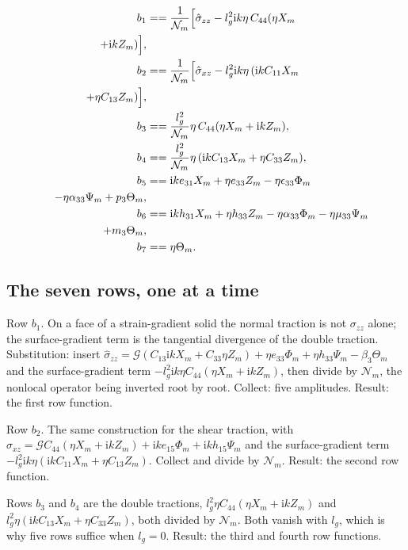 \documentclass[11pt]{article}
\makeatletter
\newif\ifshowworked
\newenvironment{worked}{%
  \ifshowworked\par\smallskip\noindent\textit{Working.}\par\smallskip\else
  \setbox\z@\vbox\bgroup\fi}{\ifshowworked\par\smallskip\else\egroup\fi}
\newcommand{\ii}{\mathrm{i}}
\newcommand{\Ncal}{\mathcal{N}}
\newcommand{\Gcal}{\mathcal{G}}
\makeatother
\begin{document}
\begin{align}
b_1&==\frac{1}{\Ncal_m}\Bigl[\hat\sigma_{zz}-l_g^2\ii k\eta\,C_{44}(\eta X_m \\
\quad +\ii kZ_m)\Bigr], \\
b_2&==\frac{1}{\Ncal_m}\Bigl[\hat\sigma_{xz}-l_g^2\ii k\eta\,(\ii kC_{11}X_m \\
\quad +\eta C_{13}Z_m)\Bigr], \\
b_3&==\frac{l_g^2}{\Ncal_m}\eta\,C_{44}(\eta X_m+\ii kZ_m), \\
b_4&==\frac{l_g^2}{\Ncal_m}\eta\,(\ii kC_{13}X_m+\eta C_{33}Z_m), \\
b_5&==\ii ke_{31}X_m+\eta e_{33}Z_m-\eta\epsilon_{33}\Phi_m \\
\quad -\eta\alpha_{33}\Psi_m+p_3\Theta_m, \\
b_6&==\ii kh_{31}X_m+\eta h_{33}Z_m-\eta\alpha_{33}\Phi_m-\eta\mu_{33}\Psi_m \\
\quad +m_3\Theta_m, \\
b_7&==\eta\Theta_m .
\end{align}

\subsection*{The seven rows, one at a time}

\begin{worked}
Row $b_1$. On a face of a strain-gradient solid the normal traction is not $\sigma_{zz}$ alone; the
surface-gradient term is the tangential divergence of the double traction. Substitution: insert
$\hat\sigma_{zz}=\Gcal(C_{13}\ii kX_m+C_{33}\eta Z_m)+\eta e_{33}\Phi_m+\eta h_{33}\Psi_m-\beta_3\Theta_m$
and the surface-gradient term $-l_g^2\ii k\eta C_{44}(\eta X_m+\ii kZ_m)$, then divide by $\Ncal_m$, the
nonlocal operator being inverted root by root. Collect: five amplitudes. Result: the first row function.
\end{worked}

\begin{worked}
Row $b_2$. The same construction for the shear traction, with
$\hat\sigma_{xz}=\Gcal C_{44}(\eta X_m+\ii kZ_m)+\ii ke_{15}\Phi_m+\ii kh_{15}\Psi_m$ and the
surface-gradient term $-l_g^2\ii k\eta(\ii kC_{11}X_m+\eta C_{13}Z_m)$. Collect and divide by $\Ncal_m$.
Result: the second row function.
\end{worked}

\begin{worked}
Rows $b_3$ and $b_4$ are the double tractions, $l_g^2\eta C_{44}(\eta X_m+\ii kZ_m)$ and
$l_g^2\eta(\ii kC_{13}X_m+\eta C_{33}Z_m)$, both divided by $\Ncal_m$. Both vanish with $l_g$, which is
why five rows suffice when $l_g=0$. Result: the third and fourth row functions.
\end{worked}
\end{document}
